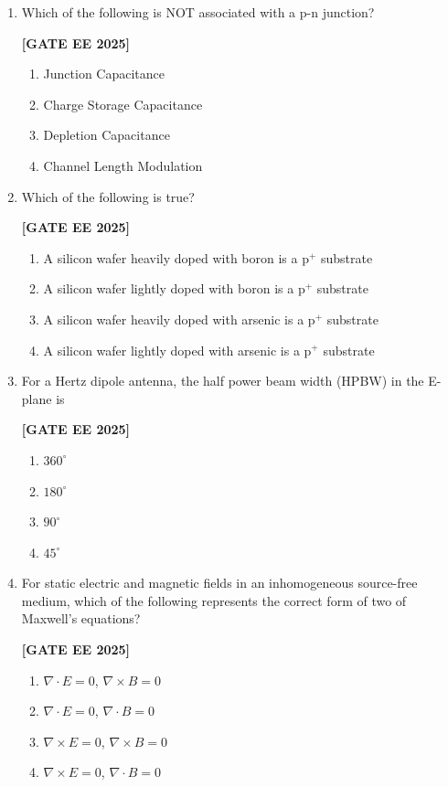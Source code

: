 \documentclass[12pt]{article}
\begin{document}
\begin{enumerate}[leftmargin=2.5em, label=\textbf{Q.\arabic*}., itemsep=2em]
\item
Which of the following is NOT associated with a p-n junction?
 
\noindent \textbf{[GATE EE 2025]}
\begin{enumerate}[label=(\Alph*)]
  \item Junction Capacitance
  \item Charge Storage Capacitance
  \item Depletion Capacitance
  \item Channel Length Modulation
\end{enumerate}

\item
Which of the following is true?
 
\noindent \textbf{[GATE EE 2025]}
\begin{enumerate}[label=(\Alph*)]
  \item A silicon wafer heavily doped with boron is a p$^+$ substrate
  \item A silicon wafer lightly doped with boron is a p$^+$ substrate
  \item A silicon wafer heavily doped with arsenic is a p$^+$ substrate
  \item A silicon wafer lightly doped with arsenic is a p$^+$ substrate
\end{enumerate}

\item
For a Hertz dipole antenna, the half power beam width (HPBW) in the E-plane is
 
\noindent \textbf{[GATE EE 2025]}
\begin{enumerate}[label=(\Alph*)]
  \item $360^\circ$
  \item $180^\circ$
  \item $90^\circ$
  \item $45^\circ$
\end{enumerate}

\item
For static electric and magnetic fields in an inhomogeneous source-free medium, which of the following represents the correct form of two of Maxwell's equations?
 
\noindent \textbf{[GATE EE 2025]}
\begin{enumerate}[label=(\Alph*)]
  \item $\nabla \cdot E = 0$, \quad $\nabla \times B = 0$
  \item $\nabla \cdot E = 0$, \quad $\nabla \cdot B = 0$
  \item $\nabla \times E = 0$, \quad $\nabla \times B = 0$
  \item $\nabla \times E = 0$, \quad $\nabla \cdot B = 0$
\end{enumerate}



\end{enumerate}
\end{document}

